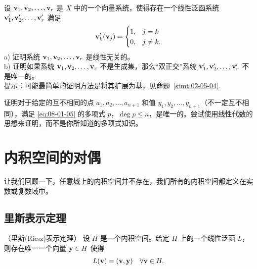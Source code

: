 \begin{problemset}
\item \label{ex:08-01-01} 设 $\mathbf{v}_1, \mathbf{v}_2, \dots, \mathbf{v}_r$ 是 $X$ 中的一个向量系统，使得存在一个线性泛函系统 $\mathbf{v}'_1, \mathbf{v}'_2, \dots, \mathbf{v}'_r$ 满足 $$\mathbf{v}'_k(\mathbf{v}_j) = \begin{cases} 1, & j=k \\ 0, & j \neq k .\end{cases}$$
a) 证明系统 $\mathbf{v}_1, \mathbf{v}_2, \dots, \mathbf{v}_r$ 是线性无关的。
\\
b) 证明如果系统 $\mathbf{v}_1, \mathbf{v}_2, \dots, \mathbf{v}_r$ 不是生成集，那么“双正交”系统 $\mathbf{v}'_1, \mathbf{v}'_2, \dots, \mathbf{v}'_r$ 不是唯一的。
\\
{\heiti 提示}：可能最简单的证明方法是将其扩展为基，见命题~\ref{stmt:02-05-04}.
\item \label{ex:08-01-02} 证明对于给定的互不相同的点 $a_1, a_2, \dots, a_{n+1}$ 和值 $y_1, y_2, \dots, y_{n+1}$（不一定互不相同），满足 \eqref{eq:08-01-05} 的多项式 $p$，$\deg p \le n$，是唯一的。尝试使用线性代数的思想来证明，而不是你所知道的多项式知识。
\end{problemset}

\section{内积空间的对偶}\label{sec:08-02}

让我们回顾一下，任意域上的内积空间并不存在，我们所有的内积空间都定义在实数或复数域中。

\subsection{里斯表示定理}\label{sec:08-02-01}

\begin{theorem}\label{stmt:08-02-01} （里斯(Riesz)表示定理）
设 $H$ 是一个内积空间。给定 $H$ 上的一个线性泛函 $L$，则存在唯一一个向量 $\mathbf{y} \in H$ 使得
\begin{equation}\label{eq:08-02-01}
L(\mathbf{v}) = (\mathbf{v}, \mathbf{y}) \quad \forall \mathbf{v} \in H .
\end{equation}\end{theorem}

